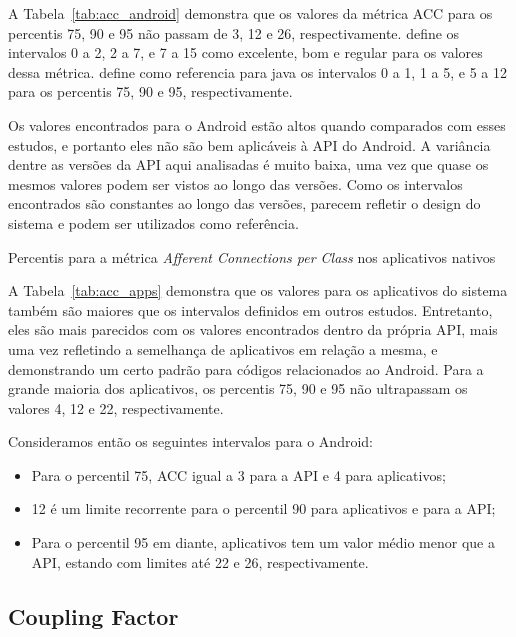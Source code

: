 A Tabela~\ref{tab:acc_android} demonstra que os valores da métrica ACC para os percentis 75, 90 e 95 não passam de 3, 12 e 26, respectivamente.  define os intervalos 0 a 2, 2 a 7, e 7 a 15 como excelente, bom e regular para os valores dessa métrica.  define como referencia para java os intervalos 0 a 1, 1 a 5, e 5 a 12 para os percentis 75, 90 e 95, respectivamente.

Os valores encontrados para o Android estão altos quando comparados com esses estudos, e portanto eles não são bem aplicáveis à API do Android. A variância dentre as versões da API aqui analisadas é muito baixa, uma vez que quase os mesmos valores podem ser vistos ao longo das versões. Como os intervalos encontrados são constantes ao longo das versões, parecem refletir o design do sistema e podem ser utilizados como referência.

\begin{table}[!htb]

\caption{Percentis para a métrica \textit{Afferent Connections per Class} nos aplicativos nativos}
\label{tab:acc_apps}
\end{table}

A Tabela~\ref{tab:acc_apps} demonstra que os valores para os aplicativos do sistema também são maiores que os intervalos definidos em outros estudos. Entretanto, eles são mais parecidos com os valores encontrados dentro da própria API, mais uma vez refletindo a semelhança de aplicativos em relação a mesma, e demonstrando um certo padrão para códigos relacionados ao Android. Para a grande maioria dos aplicativos, os percentis 75, 90 e 95 não ultrapassam os valores 4, 12 e 22, respectivamente.

Consideramos então os seguintes intervalos para o Android:

\begin{itemize}
\item Para o percentil 75, ACC igual a 3 para a API e 4 para aplicativos;
\item 12 é um limite recorrente para o percentil 90 para aplicativos e para a API;
\item Para o percentil 95 em diante, aplicativos tem um valor médio menor que a API, estando com limites até 22 e 26, respectivamente.
\end{itemize}

\subsection{Coupling Factor}


